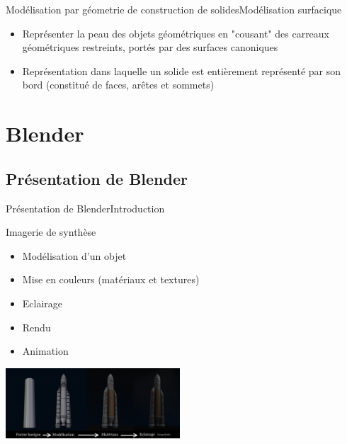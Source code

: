 \documentclass{beamer}
\begin{document}

\begin{frame}[c]{Modélisation par géometrie de construction de solides}{Modélisation surfacique}
\begin{itemize}
\item Représenter la peau des objets géométriques en "cousant" des carreaux géométriques restreints, portés par des surfaces canoniques %
\newline
\item Représentation dans laquelle un solide est entièrement représenté par son bord (constitué de faces, arêtes et sommets) 
\end{itemize}




\end{frame}


\section{Blender}

\subsection{Présentation de Blender}

\begin{frame}[c]{Présentation de Blender}{Introduction}
\begin{block}{Imagerie de synthèse}
\begin{itemize}
\item Modélisation d'un objet
\item Mise en couleurs (matériaux et textures)
\item Eclairage
\item Rendu
\item Animation
\end{itemize}
\end{block}
\newline
\begin{center}
\includegraphics[width=65mm]{presentationBlender/process.png}
\end{center}
\end{frame}
\end{document}
